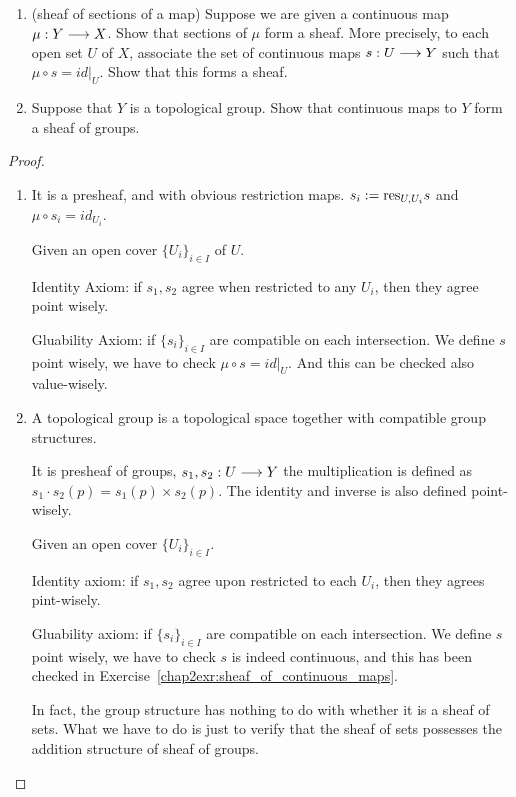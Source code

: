 \begin{exr}\ 
\begin{enumerate}[label=(\alph*)]
\item 
(sheaf of sections of a map) Suppose we are given a continuous map $\mu : Y \longrightarrow X$. Show that sections of $\mu$ form a sheaf. More precisely, to each open set $U$ of $X$, associate the set of continuous maps $s: U \longrightarrow  Y$ such that $\mu\circ s   = id|_U$. Show that this forms a sheaf. 
\item Suppose that $Y$ is a topological group. Show that continuous maps to $Y$ form a sheaf of groups.
\end{enumerate}
\end{exr}
\begin{proof}\ 
\begin{enumerate}[label=(\alph*)]
\item It is a presheaf, and with obvious restriction maps. $s_i:=\text{res}_{U,U_i}s$ and $\mu\circ s_i=id_{U_i}$. 

Given an open cover $\{U_i\}_{i\in I}$ of $U$.

Identity Axiom:  if $s_1,s_2$ agree when restricted to any $U_i$, then they agree point wisely.

Gluability Axiom: if $\{s_i\}_{i\in I}$  are compatible on each intersection. We define $s$ point wisely, we have to check $\mu\circ s=id|_U$. And this can be checked also value-wisely.
\item A topological group is a topological space together with  compatible group structures.

It is presheaf of groups, $s_1,s_2:U\longrightarrow Y$ the multiplication is defined as $s_1 \cdot s_2(p)=s_1(p)\times s_2(p)$. The identity and inverse is also defined point-wisely. 

Given an open cover $\{U_i\}_{i\in I}$.

Identity axiom: if $s_1,s_2$ agree upon restricted to each $U_i$, then they agrees pint-wisely.

Gluability axiom: if $\{s_i\}_{i\in I}$  are compatible on each intersection. We define $s$ point wisely, we have to check $s$ is indeed continuous, and this has been checked in Exercise~\ref{chap2exr:sheaf_of_continuous_maps}.

 In fact, the group structure has nothing to do with whether it is a sheaf of sets.
 What we have to do is just to verify that the sheaf of sets possesses the addition structure of sheaf of groups.
\end{enumerate}
\end{proof}

